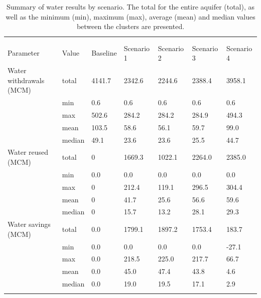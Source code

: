 \begin{table}[!ht]
	\caption{\label{tbl:resultswater}Summary of water results by scenario. The total for the entire aquifer (total), as well as the minimum (min), maximum (max), average (mean) and median values between the clusters are presented.}
	\footnotesize
	\lineup
	\begin{tabular*}{\textwidth}{@{}*{7}{l}}
		\br
		&        & \centre{5}{Scenario} \\
		\ns
		&        & \crule{5} \\
		Parameter & Value  &  Baseline &  Scenario 1 &  Scenario 2 &  Scenario 3 &  Scenario 4 \\
		\mr
		Water withdrawals (MCM) & total &    4141.7 &      2342.6 &      2244.6 &      2388.4 &      3958.1 \\
		& min &       0.6 &         0.6 &         0.6 &         0.6 &         0.6 \\
		& max &     502.6 &       284.2 &       284.2 &       284.9 &       494.3 \\
		& mean &     103.5 &        58.6 &        56.1 &        59.7 &        99.0 \\
		& median &      49.1 &        23.6 &        23.6 &        25.5 &        44.7 \\
		Water reused (MCM) & total &    0 &      1669.3 &      1022.1 &      2264.0 &      2385.0 \\
		& min &       0.0 &         0.0 &         0.0 &         0.0 &         0.0 \\
		& max &     0 &       212.4 &       119.1 &       296.5 &       304.4 \\
		& mean &      0 &        41.7 &        25.6 &        56.6 &        59.6 \\
		& median &      0 &        15.7 &        13.2 &        28.1 &        29.3 \\
		Water savings (MCM) & total &       0.0 &      1799.1 &      1897.2 &      1753.4 &       183.7 \\
		& min &       0.0 &         0.0 &         0.0 &         0.0 &       -27.1 \\
		& max &       0.0 &       218.5 &       225.0 &       217.7 &        66.7 \\
		& mean &       0.0 &        45.0 &        47.4 &        43.8 &         4.6 \\
		& median &       0.0 &        19.0 &        19.5 &        17.1 &         2.9 \\
		\br
	\end{tabular*}
\end{table}

